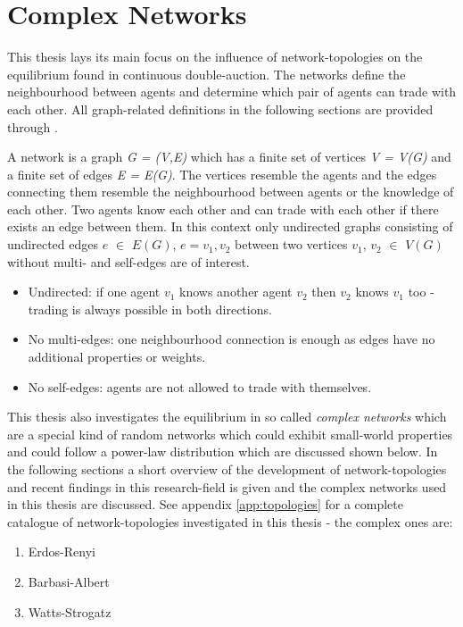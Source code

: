 \documentclass[../Bachelorarbeit.tex]{subfiles}
\begin{document}
\graphicspath{{./figures/theory/nw/}}	%

\section{Complex Networks}
\label{sec:theory_complexNetworks}
This thesis lays its main focus on the influence of network-topologies on the equilibrium found in continuous double-auction. The networks define the neighbourhood between agents and determine which pair of agents can trade with each other. All graph-related definitions in the following sections are provided through \cite{Drmota2007}.

\medskip

A network is a graph \textit{G = (V,E)} which has a finite set of vertices \textit{V = V(G)} and a finite set of edges \textit{E = E(G)}. The vertices resemble the agents and the edges connecting them resemble the neighbourhood between agents or the knowledge of each other. Two agents know each other and can trade with each other if there exists an edge between them. In this context only undirected graphs consisting of undirected edges $e$ $\in$ $E(G)$, $e = {v_1, v_2}$ between two vertices $v_1$, $v_2$ $\in$ $V(G)$ without multi- and self-edges are of interest.

\begin{itemize}
\item Undirected: if one agent $v_1$ knows another agent $v_2$ then $v_2$ knows $v_1$ too - trading is always possible in both directions.
\item No multi-edges: one neighbourhood connection is enough as edges have no additional properties or weights.
\item No self-edges: agents are not allowed to trade with themselves.
\end{itemize}

This thesis also investigates the equilibrium in so called \textit{complex networks} which are a special kind of random networks which could exhibit small-world properties and could follow a power-law distribution which are discussed shown below. In the following sections a short overview of the development of network-topologies and recent findings in this research-field is given and the complex networks used in this thesis are discussed. See appendix \ref{app:topologies} for a complete catalogue of network-topologies investigated in this thesis - the complex ones are:

\begin{enumerate}
\item Erdos-Renyi
\item Barbasi-Albert
\item Watts-Strogatz
\end{enumerate}
\end{document}
